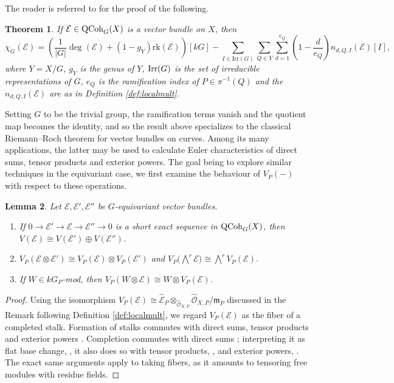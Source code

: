 \documentclass[10pt]{amsart}
\newtheorem{theorem}{Theorem}[subsection]
\newtheorem{lemma}[theorem]{Lemma}
\theoremstyle{definition}
\begin{document}
The reader is referred to  {\cite[(3.7)]{MR589254}} for the proof of the following.
\begin{theorem} \label{th:EL}
If $\mathcal{E}\in{\rm QCoh}_G(X)$ is a vector bundle on $X$, then
\[
\chi_G(\mathcal{E})
=
  \left( 
\frac{1}{|G|} \deg(\mathcal{E})+(1-g_Y) \mathrm{rk}(\mathcal{E})
  \right)[kG]
  - 
  \sum_{I \in \mathrm{Irr}(G)} 
  \sum_{Q\in Y}
  \sum_{d=1}^{e_Q}
\left(
1 -\frac{d}{e_Q}
\right)
n_{d,Q,I}(\mathcal{E}) [I],
\]
where $Y=X/G$, $g_Y$ is the genus of $Y$, ${\rm Irr}(G)$ is the set of irreducible representations of $G$, $e_Q$ is the ramification index of $P\in\pi^{-1}(Q)$ and the $n_{d,Q,I}(\mathcal{E})$ are as in Definition \ref{def:localmult}. 
\end{theorem}
Setting $G$ to be the trivial group, the ramification terms vanish and the quotient map becomes the identity, and so the result above specializes to the classical Riemann–Roch theorem for vector bundles on curves. Among its many applications, the latter may be used to calculate Euler characteristics of direct sums, tensor products and exterior powers. The goal being to explore similar techniques in the equivariant case, we first examine the behaviour of $V_P(-)$ with respect to these operations.
\begin{lemma}\label{lem:localprops}
Let $\mathcal{E}, \mathcal{E}',\mathcal{E}''$ be $G$-equivariant vector bundles.
\begin{enumerate}
\item If $0\rightarrow \mathcal{E}'\rightarrow \mathcal{E}\rightarrow\mathcal{E}''\rightarrow 0$ is a short exact sequence in ${\rm QCoh}_G(X)$, then 
$
V(\mathcal{E})\cong V(\mathcal{E}')\oplus V(\mathcal{E}'')
$.\\
\item $V_{P}(\mathcal{E}\otimes \mathcal{E}')\cong V_{P}(\mathcal{E})\otimes V_P( \mathcal{E}')$ and $V_P\big(\bigwedge^r\mathcal{E}\big)\cong \bigwedge^r V_P(\mathcal{E})$.\\
\item If $W\in kG_P$-mod, then $V_P(W\otimes \mathcal{E})\cong W\otimes V_P(\mathcal{E})$.
\end{enumerate}
\end{lemma}
\begin{proof}
Using the isomorphism $V_{P}(\mathcal{E})\cong \widehat{\mathcal{E}}_P\otimes_{\widehat{\mathcal{O}}_{X,P}} \widehat{\mathcal{O}}_{X,P}/\mathfrak{m}_P$ discussed in the Remark following Definition \ref{def:localmult},  we regard $V_{P}(\mathcal{E})$ as the fiber of a completed stalk. Formation of stalks commutes with direct sums, tensor products and exterior powers \cite[7.4.1, 7.4.7 and 7.20.5]{MR4225278}. Completion commutes with direct sums \cite[7.15]{Eisenbud:95}; interpreting it as flat base change, \cite[7.2]{Eisenbud:95}, it also does so with tensor products,  \cite[Appendix A, Formula 11]{MR1011461}, and exterior powers, \cite[Appendix C, (4)]{MR1011461}. The exact same arguments apply to taking fibers, as it amounts to tensoring free modules with residue fields.
\end{proof}
\end{document}

